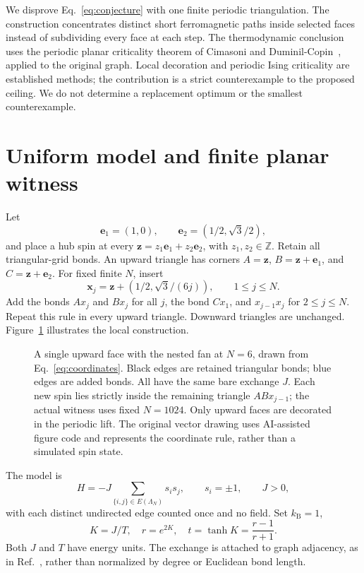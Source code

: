 \documentclass[aps,pre,reprint,amsmath,amssymb,nofootinbib,longbibliography,floatfix]{revtex4-2}
\newcommand{\Fan}{\Lambda_N}
\begin{document}
We disprove Eq.~\eqref{eq:conjecture} with one finite periodic triangulation. The construction concentrates distinct short ferromagnetic paths inside selected faces instead of subdividing every face at each step. The thermodynamic conclusion uses the periodic planar criticality theorem of Cimasoni and Duminil-Copin~\cite{CimasoniDuminilCopin2013}, applied to the original graph. Local decoration and periodic Ising criticality are established methods; the contribution is a strict counterexample to the proposed ceiling. We do not determine a replacement optimum or the smallest counterexample.

\section{Uniform model and finite planar witness}
Let
\begin{equation}
 \boldsymbol e_1=(1,0),\qquad
 \boldsymbol e_2=(1/2,\sqrt3/2),
\end{equation}
and place a hub spin at every \(\boldsymbol z=z_1\boldsymbol e_1+z_2\boldsymbol e_2\), with \(z_1,z_2\in\mathbb Z\). Retain all triangular-grid bonds. An upward triangle has corners \(A=\boldsymbol z\), \(B=\boldsymbol z+\boldsymbol e_1\), and \(C=\boldsymbol z+\boldsymbol e_2\). For fixed finite \(N\), insert
\begin{equation}
 \boldsymbol x_j=\boldsymbol z+
       (1/2,\sqrt3/(6j)),\qquad 1\leq j\leq N.
 \label{eq:coordinates}
\end{equation}
Add the bonds \(A x_j\) and \(B x_j\) for all \(j\), the bond \(C x_1\), and \(x_{j-1}x_j\) for \(2\leq j\leq N\). Repeat this rule in every upward triangle. Downward triangles are unchanged. Figure~\ref{fig:fan} illustrates the local construction.

\begin{figure}[t]
 \centering
 
 \caption{A single upward face with the nested fan at \(N=6\), drawn from Eq.~\eqref{eq:coordinates}. Black edges are retained triangular bonds; blue edges are added bonds. All have the same bare exchange \(J\). Each new spin lies strictly inside the remaining triangle \(ABx_{j-1}\); the actual witness uses fixed \(N=1024\). Only upward faces are decorated in the periodic lift. The original vector drawing uses AI-assisted figure code and represents the coordinate rule, rather than a simulated spin state.}
 \label{fig:fan}
\end{figure}

The model is
\begin{equation}
 H=-J\sum_{\{i,j\}\in E(\Fan)}s_i s_j,\qquad
 s_i=\pm1,\qquad J>0,
 \label{eq:hamiltonian}
\end{equation}
with each distinct undirected edge counted once and no field. Set \(k_{\mathrm B}=1\),
\begin{equation}
 K=J/T,\quad r=e^{2K},\quad t=\tanh K=\frac{r-1}{r+1}.
 \label{eq:variables}
\end{equation}
Both \(J\) and \(T\) have energy units. The exchange is attached to graph adjacency, as in Ref.~\cite{JosephWalshBoettcher2026}, rather than normalized by degree or Euclidean bond length.
\end{document}
